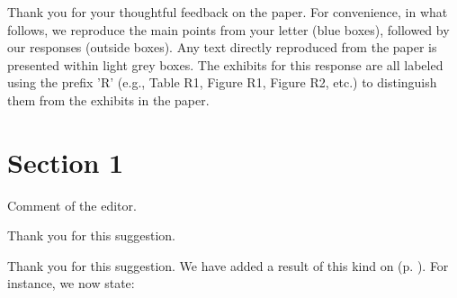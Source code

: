 Thank you for your thoughtful feedback on the paper. For convenience, in what follows, we reproduce the main points from your letter (blue boxes), followed by our responses (outside boxes). Any text directly reproduced from the paper is presented within light grey boxes. The exhibits for this response are all labeled using the prefix 'R' (e.g., Table R1, Figure R1, Figure R2, etc.) to distinguish them from the exhibits in the paper.

\section{Section 1}

\begin{revcomment}[1] Comment of the editor.
\end{revcomment}

\begin{revresponse}
  Thank you for this suggestion. 
  
    Thank you for this suggestion. We have added a result of this kind on (p. \pageref{highlightedResultInPaperPage}). For instance, we now state:
\begin{changes}
\end{changes}
  
  \end{revresponse}

